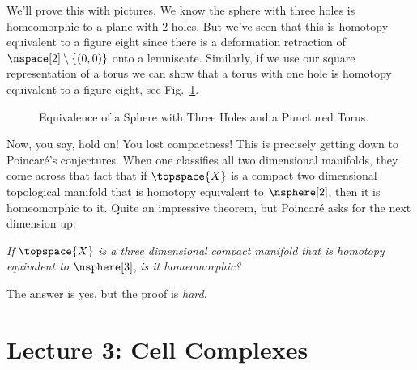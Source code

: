 \documentclass[oneside]{book}                                                  %
\begin{document}
                We'll prove this with pictures. We know the sphere with three
                holes is homeomorphic to a plane with 2 holes. But we've seen
                that this is homotopy equivalent to a figure eight since there
                is a deformation retraction of $\nspace[2]\setminus\{(0,0)\}$
                onto a lemniscate. Similarly, if we use our square
                representation of a torus we can show that a torus with one hole
                is homotopy equivalent to a figure eight, see
                Fig.~\ref{fig:HE_Torus_Sphere_Fig_8}.
                \begin{figure}[H]
                        \centering
                        \captionsetup{type=figure}
                        \resizebox{\textwidth}{!}{%
                        }
                        \caption{%
                            Equivalence of a Sphere with Three Holes and a
                            Punctured Torus.%
                        }
                        \label{fig:HE_Torus_Sphere_Fig_8}
                \end{figure}
                Now, you say, hold on! You lost compactness! This is precisely
                getting down to Poincar\'{e}'s conjectures. When one classifies
                all two dimensional manifolds, they come across that fact that
                if $\topspace{X}$ is a compact two dimensional topological
                manifold that is homotopy equivalent to $\nsphere[2]$, then it
                is homeomorphic to it. Quite an impressive theorem, but
                Poincar\'{e} asks for the next dimension up:
                \begin{center}
                    \textit{If} $\topspace{X}$ \textit{is a three dimensional}
                    \textit{compact manifold that is homotopy equivalent to}
                    $\nsphere[3]$, \textit{is it homeomorphic?}
                \end{center}
                The answer is yes, but the proof is \textit{hard}.
        \section{Lecture 3: Cell Complexes}
\end{document}
